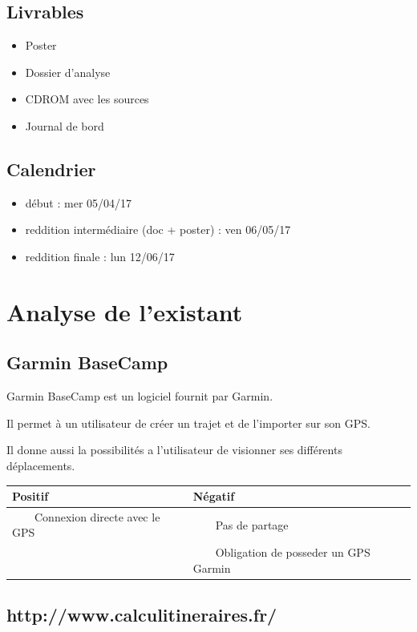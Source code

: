 \documentclass[a4paper]{article}
\newcommand{\tabitem}{~~\llap{\textbullet}~~}
\begin{document}
\subsection{Livrables}
\begin{itemize}
	\item Poster
	\item Dossier d'analyse
	\item CDROM avec les sources
	\item Journal de bord
\end{itemize}

\subsection{Calendrier}
\begin{itemize}
	\item début : mer 05/04/17
	\item reddition intermédiaire (doc + poster) : ven 06/05/17
	\item reddition finale : lun 12/06/17
\end{itemize}


\pagebreak

\section{Analyse de l'existant}


\subsection{Garmin BaseCamp}
Garmin BaseCamp est un logiciel fournit par Garmin.

Il permet à un utilisateur de créer un trajet et de l'importer sur son GPS.

Il donne aussi la possibilités a l'utilisateur de visionner ses différents déplacements.

\begin{tabular}{|l|l|}
	\hline
	Positif                                & Négatif                                       \\ \hline\hline
	\tabitem Connexion directe avec le GPS & \tabitem Pas de partage                       \\
	                                       & \tabitem Obligation de posseder un GPS Garmin \\ \hline
\end{tabular}
 
\subsection{http://www.calculitineraires.fr/}
\end{document}
